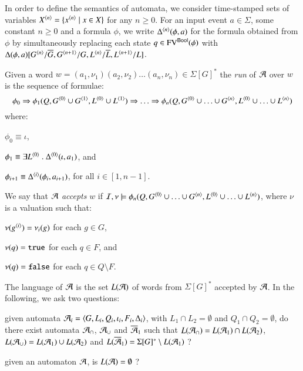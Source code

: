\documentclass{llncs}
\begin{document}
In order to define the semantics of automata, we consider time-stamped
sets of variables ${X}^{\left\langle n \right\rangle} = \{{x}^{\left\langle n \right\rangle} \mid x \in X\}$ for
any $n\geq0$. For an input event $a \in \Sigma$, some constant
$n\geq0$ and a formula $\phi$, we write ${\Delta}^{\left\langle n \right\rangle}(\phi,a)$
for the formula obtained from $\phi$ by simultaneously replacing each
state $q \in \mathrm{FV}^{\mathsf{Bool}}(\phi)$ with
$\Delta(\phi,a)[{G}^{\left\langle n \right\rangle}/\overline{G}, {G}^{\left\langle n+1 \right\rangle}/G,
  {L}^{\left\langle n \right\rangle}/\overline{L}, {L}^{\left\langle n+1 \right\rangle}/L]$.

Given a word $w = (a_1,\nu_1)(a_2,\nu_2) \ldots (a_n,\nu_n) \in
\Sigma[G]^*$ the \emph{run} of $\mathcal{A}$ over $w$ is the sequence of
formulae: \[\phi_0 \Rightarrow \phi_1(Q,{G}^{\left\langle 0 \right\rangle} \cup {G}^{\left\langle 1 \right\rangle},
{L}^{\left\langle 0 \right\rangle} \cup {L}^{\left\langle 1 \right\rangle}) \Rightarrow \ldots \Rightarrow
\phi_n(Q,{G}^{\left\langle 0 \right\rangle} \cup \ldots \cup {G}^{\left\langle n \right\rangle}, {L}^{\left\langle 0 \right\rangle} \cup
\ldots \cup {L}^{\left\langle n \right\rangle})\]
where: \begin{compactitem}
\item $\phi_0 \equiv \iota$, 
%
\item $\phi_1 \equiv \exists {L}^{\left\langle 0 \right\rangle} ~.~ {\Delta}^{\left\langle 0 \right\rangle}(\iota,a_1)$, and
%
\item $\phi_{i+1} \equiv {\Delta}^{\left\langle i \right\rangle}(\phi_i,a_{i+1})$, for all $i \in [1,n-1]$.
\end{compactitem}
We say that $\mathcal{A}$ \emph{accepts} $w$ if $\mathcal{I},\nu \models
\phi_n(Q,{G}^{\left\langle 0 \right\rangle} \cup \ldots \cup {G}^{\left\langle n \right\rangle}, {L}^{\left\langle 0 \right\rangle} \cup
\ldots \cup {L}^{\left\langle n \right\rangle})$, where $\nu$ is a valuation such
that: \begin{compactitem}
\item $\nu({g}^{\left\langle i \right\rangle}) = \nu_i(g)$ for each $g \in G$, 
%
\item $\nu(q) = \mathtt{true}$ for each $q \in F$, and
%
\item $\nu(q) = \mathtt{false}$ for each $q \in Q \setminus F$.
\end{compactitem}
The language of $\mathcal{A}$ is the set $L(\mathcal{A})$ of words from $\Sigma[G]^*$
accepted by $\mathcal{A}$. In the following, we ask two
questions: \begin{compactenum}
\item given automata $\mathcal{A}_i = \left\langle G,L_i,Q_i,\iota_i,F_i,\Delta_i \right\rangle$,
  with $L_1 \cap L_2 = \emptyset$ and $Q_1 \cap Q_2 = \emptyset$, do
  there exist automata $\mathcal{A}_\cap$, $\mathcal{A}_\cup$ and $\overline{\mathcal{A}}_1$ such
  that $L(\mathcal{A}_\cap) = L(\mathcal{A}_1) \cap L(\mathcal{A}_2)$, $L(\mathcal{A}_\cup) = L(\mathcal{A}_1) \cup
  L(\mathcal{A}_2)$ and $L(\overline{\mathcal{A}}_1) = \Sigma[G]^* \setminus L(\mathcal{A}_1)$ ?
%
\item given an automaton $\mathcal{A}$, is $L(\mathcal{A}) = \emptyset$ ? 
\end{compactenum}

\end{document}
